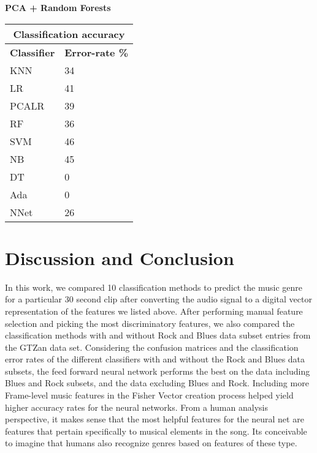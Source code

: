 \documentclass{article} %
\begin{document}
\textbf{PCA + Random Forests} 
\vspace{5mm}
\vspace{5mm}
\begin{tabular}{ |p{2cm}|p{2.3cm}|}
\hline
\multicolumn{2}{|c|}{\textbf{Classification accuracy}} \\
\hline
\textbf{Classifier} & \textbf{Error-rate \%} \\
\hline
KNN & 34 \\
LR & 41  \\
PCALR & 39 \\
RF    &  36 \\
SVM & 46 \\
NB & 45 \\
DT & 0 \\
Ada & 0 \\
NNet & 26 \\
\hline
\end{tabular}

\section{Discussion and Conclusion}
In this work, we compared 10 classification methods to predict the music genre for a particular 30 second clip after converting the audio signal to a digital vector representation of the features we listed above. After performing manual feature selection and picking the most discriminatory features, we also compared the classification methods with and without Rock and Blues data subset entries from the GTZan data set. Considering the confusion matrices and the classification error rates of the different classifiers with and without the Rock and Blues data subsets, the feed forward neural network performs the best on the data including Blues and Rock subsets, and the data excluding Blues and Rock. Including more Frame-level music features in the Fisher Vector creation process helped yield higher accuracy rates for the neural networks. From a human analysis perspective, it makes sense that the most helpful features for the neural net are features that pertain specifically to musical elements in the song. Its conceivable to imagine that humans also recognize genres based on features of these type.
\end{document}
